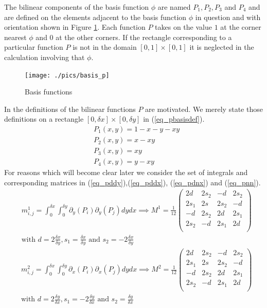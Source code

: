 \documentclass[11pt,fleqn]{article}
\theoremstyle{defstyle}
\begin{document}
The bilinear components of the basis function $\phi$ are named $P_1, P_2, P_3$ and $P_4$ and are defined on the elements adjacent to the basis function $\phi$ in question and with orientation shown in Figure \ref{fig_pbasis}. Each function $P$ takes on the value $1$ at the corner nearest $\phi$ and $0$ at the other corners. If the rectangle corresponding to a particular function $P$ is not in the domain $[0,1]\times[0,1]$ it is neglected in the calculation involving that $\phi$. 
\begin{figure}[H] 
\centering
\texttt{[image: ./pics/basis\_p]}
\caption{Basis functions} 
\label{fig_pbasis}
\end{figure}
In \cite{vrb} the definitions of the bilinear functions $P$ are motivated. We merely state those definitions on a rectangle $[0,\delta x] \times [0, \delta y]$ in (\ref{eq_pbasisdef}). 
\begin{equation}
\begin{aligned}
&P_1(x,y) = 1 -x-y-xy \\
&P_2(x,y) = x-xy \\
&P_3(x,y) = xy \\
&P_4(x,y) = y-xy 
\label{eq_pbasisdef}
\end{aligned}
\end{equation}  
For reasons which will become clear later we consider the set of integrals and corresponding matrices in (\ref{eq_pddy}),(\ref{eq_pddx}),  (\ref{eq_pdnx}) and (\ref{eq_pnn}).
\begin{equation}
\begin{aligned}
&m^1_{i,j} = \int_0^{\delta x} \int_0^{\delta y} \partial_y(P_i) \partial_y(P_j) dydx \implies
M^1 = \frac{1}{12}\begin{pmatrix}
2d & 2s_2 & -d & 2s_2 \\
2s_1 & 2s & 2s_2 & -d \\
-d & 2s_2 & 2d & 2s_1 \\
2s_2 & -d & 2s_1 & 2d \\
\end{pmatrix} \\
&\text{with } d = 2\frac{\delta x}{\delta y}, s_1 = \frac{\delta x}{\delta y} \text{ and } s_2 = -2\frac{\delta x}{\delta y}
\end{aligned}
\label{eq_pddy}
\end{equation}
\begin{equation}
\begin{aligned}
&m^2_{i,j} = \int_0^{\delta x} \int_0^{\delta y} \partial_x(P_i) \partial_x(P_j) dydx \implies
M^2 = \frac{1}{12}\begin{pmatrix}
2d & 2s_2 & -d & 2s_2 \\
2s_1 & 2s & 2s_2 & -d \\
-d & 2s_2 & 2d & 2s_1 \\
2s_2 & -d & 2s_1 & 2d \\
\end{pmatrix} \\
&\text{with } d = 2\frac{\delta y}{\delta x}, s_1 = -2\frac{\delta y}{\delta x} \text{ and } s_2 = \frac{\delta y}{\delta x}
\end{aligned}
\label{eq_pddx}
\end{equation}
\end{document}
